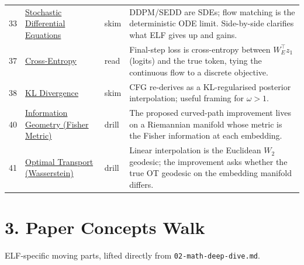 \documentclass[11pt]{article}
\begin{document}
\begin{longtable}{p{}p{}p{}p{}}
33 & \href{https://github.com/pleyva2004/math-foundations/blob/main/concepts/33-sde/README.md}{Stochastic Differential Equations} & skim & DDPM/SEDD are SDEs; flow matching is the deterministic ODE limit. Side-by-side clarifies what ELF gives up and gains. \\
37 & \href{https://github.com/pleyva2004/math-foundations/blob/main/concepts/37-cross-entropy/README.md}{Cross-Entropy} & read & Final-step loss is cross-entropy between $W_E^\top z_1$ (logits) and the true token, tying the continuous flow to a discrete objective. \\
38 & \href{https://github.com/pleyva2004/math-foundations/blob/main/concepts/38-kl-divergence/README.md}{KL Divergence} & skim & CFG re-derives as a KL-regularised posterior interpolation; useful framing for $\omega > 1$. \\
40 & \href{https://github.com/pleyva2004/math-foundations/blob/main/concepts/40-information-geometry/README.md}{Information Geometry (Fisher Metric)} & drill & The proposed curved-path improvement lives on a Riemannian manifold whose metric is the Fisher information at each embedding. \\
41 & \href{https://github.com/pleyva2004/math-foundations/blob/main/concepts/41-optimal-transport/README.md}{Optimal Transport (Wasserstein)} & drill & Linear interpolation is the Euclidean $W_2$ geodesic; the improvement asks whether the true OT geodesic on the embedding manifold differs. \\
\bottomrule
\end{longtable}

\section*{3. Paper Concepts Walk}

ELF-specific moving parts, lifted directly from \texttt{02-math-deep-dive.md}.
\end{document}
